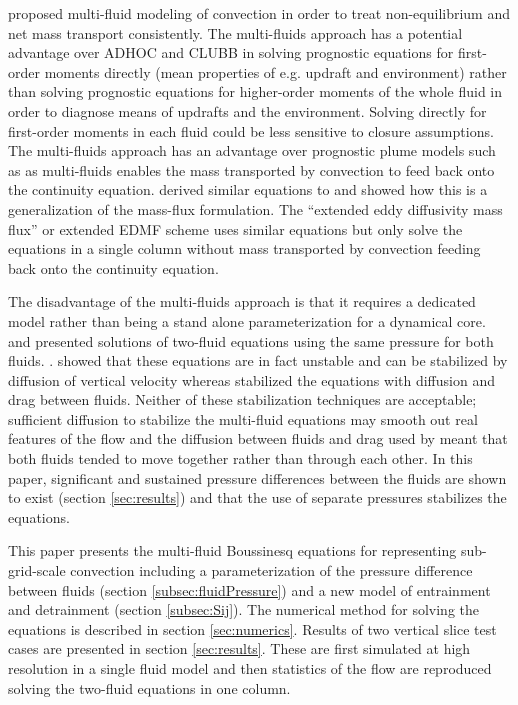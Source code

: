 \documentclass[draft]{agujournal2019}
\begin{document}
 proposed multi-fluid modeling of convection in order
to treat non-equilibrium and net mass transport  consistently.
The multi-fluids approach has a potential advantage over ADHOC and CLUBB in solving prognostic equations for first-order moments directly (mean properties of e.g. updraft and environment) rather than solving prognostic equations for higher-order moments of the whole fluid in order to diagnose means of updrafts and the environment. Solving directly for first-order moments in each fluid could be less sensitive to closure assumptions.
The multi-fluids approach has an advantage over prognostic plume models such as \protect{} as multi-fluids enables the mass transported by convection to feed back onto the continuity equation.  derived similar
equations to   and showed how this is a generalization
of the mass-flux formulation. The  ``extended eddy
diffusivity mass flux'' or extended EDMF scheme  uses similar
equations but 
only solve the equations in a single column without
{mass transported by convection feeding back onto the continuity equation.}

The disadvantage of the multi-fluids approach is that it requires
a dedicated model rather than being a stand alone parameterization
for a dynamical core.  and  presented solutions
of two-fluid equations
using the same pressure
for both fluids.
.  showed that these equations  are in fact unstable and can be stabilized by diffusion of vertical
velocity whereas  stabilized the equations with diffusion
and drag between fluids. Neither of these stabilization techniques
are acceptable;
sufficient diffusion to stabilize the multi-fluid equations may smooth out real features of the flow and the diffusion between fluids and drag used by \protect{} meant that both fluids tended to move together rather than through each other.
In this paper,  significant
and sustained pressure differences between the fluids are shown to exist (section \ref{sec:results}) and that the use of separate pressures stabilizes the equations. 

This paper presents the multi-fluid Boussinesq equations for representing
sub-grid-scale convection including a parameterization of the pressure
difference between fluids (section \ref{subsec:fluidPressure}) and
a new model of entrainment and detrainment (section \ref{subsec:Sij}).
The numerical method for solving the equations is described in section
\ref{sec:numerics}. Results of two vertical slice test cases are presented in section {\protect\ref{sec:results}}. These are first simulated at high resolution in a single fluid model and then statistics of the flow are reproduced solving the two-fluid equations in one column.
\end{document}
